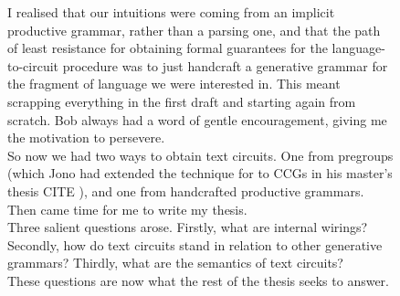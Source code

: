 \begin{figure}[h!]
\centering
{}
\caption{I realised that our intuitions were coming from an implicit productive grammar, rather than a parsing one, and that the path of least resistance for obtaining formal guarantees for the language-to-circuit procedure was to just handcraft a generative grammar for the fragment of language we were interested in. This meant scrapping everything in the first draft and starting again from scratch. Bob always had a word of gentle encouragement, giving me the motivation to persevere.\\

So now we had two ways to obtain text circuits. One from pregroups (which Jono had extended the technique for to CCGs in his master's thesis \bR CITE \e), and one from handcrafted productive grammars. Then came time for me to write my thesis.\\

Three salient questions arose. Firstly, what are internal wirings? Secondly, how do text circuits stand in relation to other generative grammars? Thirdly, what are the semantics of text circuits?\\

These questions are now what the rest of the thesis seeks to answer.
}
\end{figure}